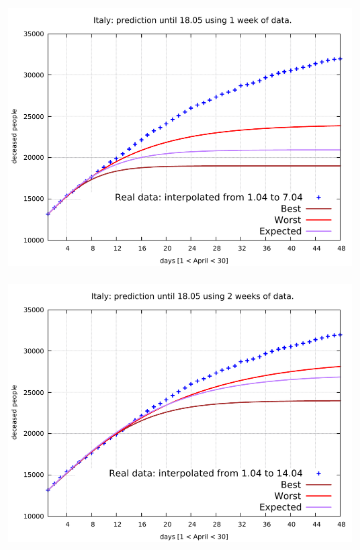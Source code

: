\documentclass[8pt]{article}
\begin{document}
\begin{figure}[h!]
  \centering
  \begin{subfigure}[b]{0.45\linewidth}
  \includegraphics[width=\linewidth]{../simulations/it/1-7/1-7.pdf}
  \end{subfigure}
  \begin{subfigure}[b]{0.45\linewidth}
    \includegraphics[width=\linewidth]{../simulations/it/1-14/1-14.pdf}
  \end{subfigure}
  \begin{subfigure}[b]{0.45\linewidth}

\end{subfigure}
\end{figure}
\end{document}
